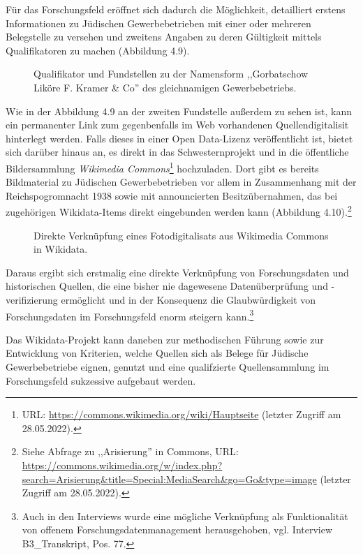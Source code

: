 Für das Forschungsfeld eröffnet sich dadurch die Möglichkeit, detailliert erstens Informationen zu Jüdischen Gewerbebetrieben mit einer oder mehreren Belegstelle zu versehen und zweitens Angaben zu deren Gültigkeit mittels Qualifikatoren zu machen (Abbildung 4.9).

\begin{figure}[h]
    \centering
    \caption{Qualifikator und Fundstellen zu der Namensform ,,Gorbatschow Liköre F. Kramer \& Co'' des gleichnamigen Gewerbebetriebs.}
    \label{fig:x cubed graph}
\end{figure}

Wie in der Abbildung 4.9 an der zweiten Fundstelle außerdem zu sehen ist, kann ein permanenter Link zum gegenbenfalls im Web vorhandenen Quellendigitalisit hinterlegt werden. Falls dieses in einer Open Data-Lizenz veröffentlicht ist, bietet sich darüber hinaus an, es direkt in das Schwesternprojekt und in die öffentliche Bildersammlung \textit{Wikimedia Commons}\footnote{URL: \url{https://commons.wikimedia.org/wiki/Hauptseite} (letzter Zugriff am 28.05.2022).} hochzuladen. Dort gibt es bereits Bildmaterial zu Jüdischen Gewerbebetrieben vor allem in Zusammenhang mit der Reichspogromnacht 1938 sowie mit announcierten Besitzübernahmen, das bei zugehörigen Wikidata-Items direkt eingebunden werden kann (Abbildung 4.10).\footnote{Siehe Abfrage zu ,,Arisierung'' in Commons, URL: \url{https://commons.wikimedia.org/w/index.php?search=Arisierung&title=Special:MediaSearch&go=Go&type=image} (letzter Zugriff am 28.05.2022).}

\begin{figure}[h]
    \centering
    \caption{Direkte Verknüpfung eines Fotodigitalisats aus Wikimedia Commons in Wikidata.}
    \label{fig:x cubed graph}
\end{figure}

Daraus ergibt sich erstmalig eine direkte Verknüpfung von Forschungsdaten und historischen Quellen, die eine bisher nie dagewesene Datenüberprüfung und -verifizierung ermöglicht und in der Konsequenz die Glaubwürdigkeit von Forschungsdaten im Forschungsfeld enorm steigern kann.\footnote{Auch in den Interviews wurde eine mögliche Verknüpfung als Funktionalität von offenem Forschungsdatenmanagement herausgehoben, vgl. Interview B3\_Transkript, Pos. 77.} 

Das Wikidata-Projekt kann daneben zur methodischen Führung sowie zur Entwicklung von Kriterien, welche Quellen sich als Belege für Jüdische Gewerbebetriebe eignen, genutzt und eine qualifzierte Quellensammlung im Forschungsfeld sukzessive aufgebaut werden.

